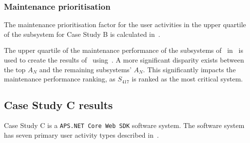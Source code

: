 \clearpage

\subsubsection{Maintenance prioritisation}
The maintenance prioritisation factor for the user activities in the upper quartile of the subsystem for Case Study B is calculated in~.



The upper quartile of the maintenance performance of the subsystems of~ in~ is used to create the results of~ using~. A more significant disparity exists between the top $A_N$ and the remaining subsystems' $A_N$. This significantly impacts the maintenance performance ranking, as $S_{417}$ is ranked as the most critical system.

\clearpage

\subsection{Case Study C results}\label{sec:ch3_csC}
Case Study C is a \texttt{APS.NET Core Web SDK} software system. The software system has seven primary user activity types described in~.

